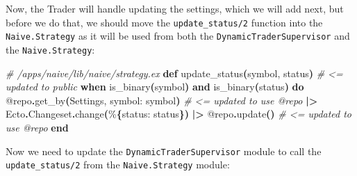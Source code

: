 \documentclass[
  oneside]{book}
\newenvironment{Shaded}{\begin{snugshade}}{\end{snugshade}}
\newcommand{\CommentTok}[1]{\textcolor[rgb]{0.56,0.35,0.01}{\textit{#1}}}
\newcommand{\ConstantTok}[1]{\textcolor[rgb]{0.56,0.35,0.01}{#1}}
\newcommand{\FunctionTok}[1]{\textcolor[rgb]{0.13,0.29,0.53}{\textbf{#1}}}
\newcommand{\KeywordTok}[1]{\textcolor[rgb]{0.13,0.29,0.53}{\textbf{#1}}}
\newcommand{\NormalTok}[1]{#1}
\newcommand{\OperatorTok}[1]{\textcolor[rgb]{0.81,0.36,0.00}{\textbf{#1}}}
\newcommand{\OtherTok}[1]{\textcolor[rgb]{0.56,0.35,0.01}{#1}}
\newcommand{\VariableTok}[1]{\textcolor[rgb]{0.00,0.00,0.00}{#1}}
\begin{document}
Now, the Trader will handle updating the settings, which we will add next, but before we do that, we should move the \texttt{update\_status/2} function into the \texttt{Naive.Strategy} as it will be used from both the \texttt{DynamicTraderSupervisor} and the \texttt{Naive.Strategy}:

\begin{Shaded}
\begin{Highlighting}[]
  \CommentTok{\# /apps/naive/lib/naive/strategy.ex}
  \KeywordTok{def}\NormalTok{ update\_status}\FunctionTok{(}\NormalTok{symbol, status}\FunctionTok{)} \CommentTok{\# \textless{}= updated to public}
      \KeywordTok{when}\NormalTok{ is\_binary}\FunctionTok{(}\NormalTok{symbol}\FunctionTok{)} \KeywordTok{and}\NormalTok{ is\_binary}\FunctionTok{(}\NormalTok{status}\FunctionTok{)} \KeywordTok{do}
    \OtherTok{@repo}\OperatorTok{.}\NormalTok{get\_by}\FunctionTok{(}\ConstantTok{Settings}\NormalTok{, }\VariableTok{symbol:}\NormalTok{ symbol}\FunctionTok{)} \CommentTok{\# \textless{}= updated to use @repo}
    \OperatorTok{|\textgreater{}} \ConstantTok{Ecto}\OperatorTok{.}\ConstantTok{Changeset}\OperatorTok{.}\NormalTok{change}\FunctionTok{(}\NormalTok{\%}\FunctionTok{\{}\VariableTok{status:}\NormalTok{ status}\FunctionTok{\})}
    \OperatorTok{|\textgreater{}} \OtherTok{@repo}\OperatorTok{.}\NormalTok{update}\FunctionTok{()} \CommentTok{\# \textless{}= updated to use @repo}
  \KeywordTok{end}
\end{Highlighting}
\end{Shaded}

Now we need to update the \texttt{DynamicTraderSupervisor} module to call the \texttt{update\_status/2} from the \texttt{Naive.Strategy} module:
\end{document}
